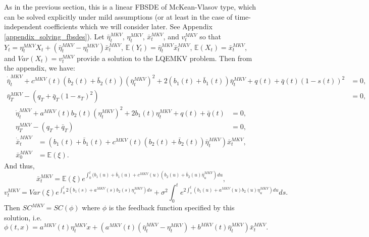 \documentclass[11pt]{article}
\begin{document}
As in the previous section, this is a linear FBSDE of McKean-Vlasov type, which can be solved explicitly under mild assumptions (or at least in the case of time-independent coefficients which we will consider later. See Appendix \ref{appendix_solving_fbsdes}). Let $\bar{\eta}_t^{MKV}$, $\eta_t^{MKV}$, $\bar{x}_t^{MKV}$, and $v^{MKV}_t$ so that $Y_t=\eta_t^{MKV}X_t+(\bar{\eta}_t^{MKV}-\eta_t^{MKV})\bar{x}_t^{MKV}$, $\mathbb{E}(Y_t)=\bar{\eta}_t^{MKV}\bar{x}_t^{MKV}$, $\mathbb{E}(X_t)=\bar{x}_t^{MKV}$, and $Var(X_t)=v^{MKV}_t$ provide a solution to the LQEMKV problem. Then from the appendix, we have:
\begin{equation}
\begin{split}
\dot{\bar{\eta}}^{MKV}_t+c^{MKV}(t)(b_2(t)+\bar{b}_2(t)) (\bar{\eta}^{MKV}_t)^2+2(b_1(t)+\bar{b}_1(t)) \bar{\eta}^{MKV}_t +q(t)+\bar{q}(t)(1-s(t))^2&=0,\\
\bar{\eta}^{MKV}_T-(q_T+\bar{q}_T(1-s_T)^2)&=0,
\end{split}
\label{eq:eta_bar_MKV}
\end{equation}
\begin{equation}
\begin{split}
\dot{\eta}^{MKV}_t+a^{MKV}(t)b_2(t)(\eta^{MKV}_t)^2+2b_1(t)\eta^{MKV}_t+q(t)+\bar{q}(t)&=0, \\
\eta^{MKV}_T-(q_T+\bar{q}_T)&=0,
\end{split}
\end{equation}
\begin{equation}
\begin{split}
\dot{\bar{x}}^{MKV}_t&=(b_1(t)+\bar{b}_1(t)+c^{MKV}(t)(b_2(t)+\bar{b}_2(t))\bar{\eta}^{MKV}_t)\bar{x}^{MKV}_t, \\
\bar{x}^{MKV}_0&=\mathbb{E}(\xi).
\end{split}
\label{eq:x_bar_MKV}
\end{equation}
And thus,
\begin{equation}
\bar{x}^{MKV}_t=\mathbb{E}(\xi) e^{\int_0^t(b_1(u)+\bar{b}_1(u)+c^{MKV}(u)(b_2(u)+\bar{b}_2(u)\bar{\eta}^{MKV}_u)du},
\end{equation}
\begin{equation}
v^{MKV}_t=Var(\xi)e^{\int_0^t 2(b_1(s)+a^{MKV}(s)b_2(s)\eta^{MKV}_s)ds}+\sigma^2 \int_0^t e^{2 \int_s^t (b_1(u)+a^{MKV}(u)b_2(u)\eta^{MKV}_u) du}ds.
\label{eq:v_t_MKV}
\end{equation}
Then $SC^{MKV}=SC(\phi)$ where $\phi$ is the feedback function specified by this solution, i.e.
\begin{equation*}
    \phi(t,x)=a^{MKV}(t)\eta_t^{MKV}x+\left(a^{MKV}(t)(\bar{\eta}_t^{MKV}-\eta_t^{MKV})+b^{MKV}(t)\bar{\eta}_t^{MKV} \right)\bar{x}_t^{MKV}.
\end{equation*}
\end{document}
